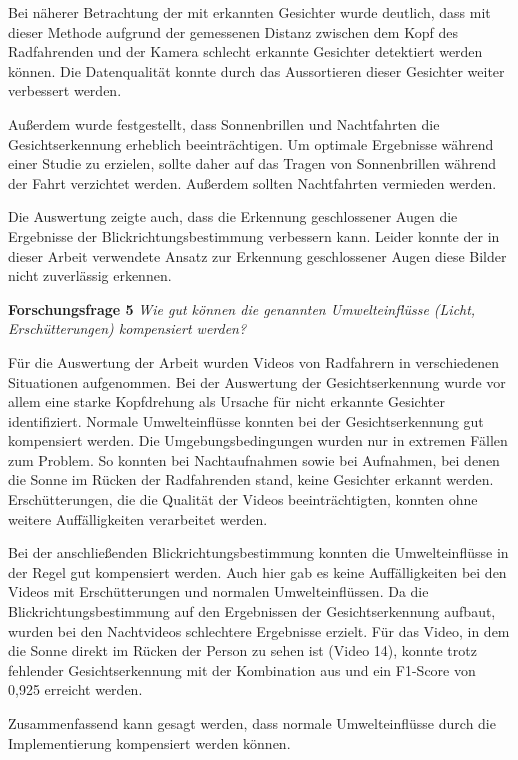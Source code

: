 Bei näherer Betrachtung der mit \dlib erkannten Gesichter wurde deutlich, dass mit dieser Methode aufgrund der gemessenen Distanz zwischen dem Kopf des Radfahrenden und der Kamera schlecht erkannte Gesichter detektiert werden können. Die Datenqualität konnte durch das Aussortieren dieser Gesichter weiter verbessert werden.

Außerdem wurde festgestellt, dass Sonnenbrillen und Nachtfahrten die Gesichtserkennung erheblich beeinträchtigen. Um optimale Ergebnisse während einer Studie zu erzielen, sollte daher auf das Tragen von Sonnenbrillen während der Fahrt verzichtet werden. Außerdem sollten Nachtfahrten vermieden werden.

Die Auswertung zeigte auch, dass die Erkennung geschlossener Augen die Ergebnisse der Blickrichtungsbestimmung verbessern kann. Leider konnte der in dieser Arbeit verwendete Ansatz zur Erkennung geschlossener Augen diese Bilder nicht zuverlässig erkennen.

\vspace{0.3cm}
\noindent\textbf{Forschungsfrage 5} \textit{
Wie gut können die genannten Umwelteinflüsse (Licht, Erschütterungen) kompensiert werden?}
\vspace{0.3cm}

Für die Auswertung der Arbeit wurden Videos von Radfahrern in verschiedenen Situationen aufgenommen. Bei der Auswertung der Gesichtserkennung wurde vor allem eine starke Kopfdrehung als Ursache für nicht erkannte Gesichter identifiziert. Normale Umwelteinflüsse konnten bei der Gesichtserkennung gut kompensiert werden. Die Umgebungsbedingungen wurden nur in extremen Fällen zum Problem. So konnten bei Nachtaufnahmen sowie bei Aufnahmen, bei denen die Sonne im Rücken der Radfahrenden stand, keine Gesichter erkannt werden. Erschütterungen, die die Qualität der Videos beeinträchtigten, konnten ohne weitere Auffälligkeiten verarbeitet werden.

Bei der anschließenden Blickrichtungsbestimmung konnten die Umwelteinflüsse in der Regel gut kompensiert werden. Auch hier gab es keine Auffälligkeiten bei den Videos mit Erschütterungen und normalen Umwelteinflüssen. Da die Blickrichtungsbestimmung auf den Ergebnissen der Gesichtserkennung aufbaut, wurden bei den Nachtvideos schlechtere Ergebnisse erzielt. Für das Video, in dem die Sonne direkt im Rücken der Person zu sehen ist (Video 14), konnte trotz fehlender Gesichtserkennung mit der Kombination aus \mediapipe und \ethg ein F1-Score von 0,925 erreicht werden.

Zusammenfassend kann gesagt werden, dass normale Umwelteinflüsse durch die Implementierung kompensiert werden können.

